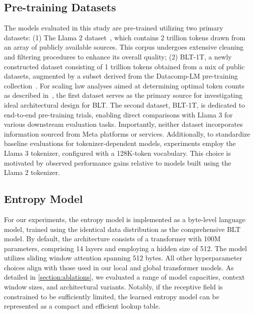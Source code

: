 \subsection{Pre-training Datasets} The models evaluated in this study are pre-trained utilizing two primary datasets: (1) The Llama 2 dataset~\citep{touvron2023llama}, which contains 2 trillion tokens drawn from an array of publicly available sources. This corpus undergoes extensive cleaning and filtering procedures to enhance its overall quality; (2) {\textsc BLT}-1T, a newly constructed dataset consisting of 1 trillion tokens obtained from a mix of public datasets, augmented by a subset derived from the Datacomp-LM pre-training collection~\citep{li2024datacomp}. For scaling law analyses aimed at determining optimal token counts as described in~\cite{dubey2024llama}, the first dataset serves as the primary source for investigating ideal architectural design for {\textsc BLT}. The second dataset, {\textsc BLT}-1T, is dedicated to end-to-end pre-training trials, enabling direct comparisons with Llama 3 for various downstream evaluation tasks. Importantly, neither dataset incorporates information sourced from Meta platforms or services. Additionally, to standardize baseline evaluations for tokenizer-dependent models, experiments employ the Llama 3 tokenizer, configured with a 128K-token vocabulary. This choice is motivated by observed performance gains relative to models built using the Llama 2 tokenizer.

\subsection{Entropy Model} For our experiments, the entropy model is implemented as a byte-level language model, trained using the identical data distribution as the comprehensive {\textsc BLT} model. By default, the architecture consists of a transformer with 100M parameters, comprising 14 layers and employing a hidden size of 512. The model utilizes sliding window attention spanning 512 bytes. All other hyperparameter choices align with those used in our local and global transformer models. As detailed in \autoref{section:ablations}, we evaluated a range of model capacities, context window sizes, and architectural variants. Notably, if the receptive field is constrained to be sufficiently limited, the learned entropy model can be represented as a compact and efficient lookup table.

